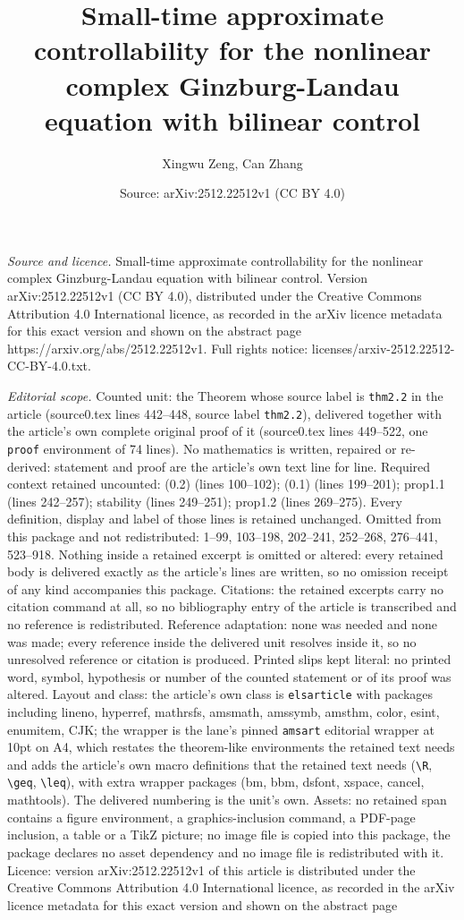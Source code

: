 \documentclass[10pt,a4paper]{amsart}
\title[Small-time approximate controllability for the nonlinear com]{Small-time approximate controllability for the nonlinear complex Ginzburg-Landau equation with bilinear control}
\author{Xingwu Zeng, Can Zhang}
\date{Source: arXiv:2512.22512v1 (CC BY 4.0)}
\begin{document}
\maketitle

\noindent\emph{Source and licence.} Small-time approximate controllability for the nonlinear complex Ginzburg-Landau equation with bilinear control. Version arXiv:2512.22512v1 (CC BY 4.0), distributed under the Creative Commons Attribution 4.0 International licence, as recorded in the arXiv licence metadata for this exact version and shown on the abstract page https://arxiv.org/abs/2512.22512v1. Full rights notice: licenses/arxiv-2512.22512-CC-BY-4.0.txt.\par\smallskip

\noindent\textit{Editorial scope.} Counted unit: the Theorem whose source label is \texttt{thm2.2} in the article (source0.tex lines 442--448, source label \texttt{thm2.2}), delivered together with the article's own complete original proof of it (source0.tex lines 449--522, one \texttt{proof} environment of 74 lines). No mathematics is written, repaired or re-derived: statement and proof are the article's own text line for line. Required context retained uncounted: (0.2) (lines 100--102); (0.1) (lines 199--201); prop1.1 (lines 242--257); stability (lines 249--251); prop1.2 (lines 269--275). Every definition, display and label of those lines is retained unchanged. Omitted from this package and not redistributed: 1--99, 103--198, 202--241, 252--268, 276--441, 523--918. Nothing inside a retained excerpt is omitted or altered: every retained body is delivered exactly as the article's lines are written, so no omission receipt of any kind accompanies this package. Citations: the retained excerpts carry no citation command at all, so no bibliography entry of the article is transcribed and no reference is redistributed. Reference adaptation: none was needed and none was made; every reference inside the delivered unit resolves inside it, so no unresolved reference or citation is produced. Printed slips kept literal: no printed word, symbol, hypothesis or number of the counted statement or of its proof was altered. Layout and class: the article's own class is \texttt{elsarticle} with packages including lineno, hyperref, mathrsfs, amsmath, amssymb, amsthm, color, esint, enumitem, CJK; the wrapper is the lane's pinned \texttt{amsart} editorial wrapper at 10pt on A4, which restates the theorem-like environments the retained text needs and adds the article's own macro definitions that the retained text needs (\texttt{\textbackslash R}, \texttt{\textbackslash geq}, \texttt{\textbackslash leq}), with extra wrapper packages (bm, bbm, dsfont, xspace, cancel, mathtools). The delivered numbering is the unit's own. Assets: no retained span contains a figure environment, a graphics-inclusion command, a PDF-page inclusion, a table or a TikZ picture; no image file is copied into this package, the package declares no asset dependency and no image file is redistributed with it. Licence: version arXiv:2512.22512v1 of this article is distributed under the Creative Commons Attribution 4.0 International licence, as recorded in the arXiv licence metadata for this exact version and shown on the abstract page 
\end{document}

